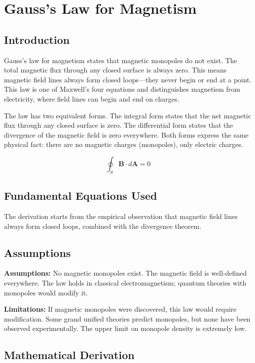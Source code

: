 \chapter{Gauss's Law for Magnetism}

\section*{Introduction}

Gauss's law for magnetism states that magnetic monopoles do not exist. The total magnetic flux through any closed surface is always zero. This means magnetic field lines always form closed loops---they never begin or end at a point. This law is one of Maxwell's four equations and distinguishes magnetism from electricity, where field lines can begin and end on charges.

The law has two equivalent forms. The integral form states that the net magnetic flux through any closed surface is zero. The differential form states that the divergence of the magnetic field is zero everywhere. Both forms express the same physical fact: there are no magnetic charges (monopoles), only electric charges.

\begin{equation}
\oint_S \mathbf{B} \cdot d\mathbf{A} = 0
\end{equation}

\section*{Fundamental Equations Used}

The derivation starts from the empirical observation that magnetic field lines always form closed loops, combined with the divergence theorem.

\section*{Assumptions}

\textbf{Assumptions:} No magnetic monopoles exist. The magnetic field is well-defined everywhere. The law holds in classical electromagnetism; quantum theories with monopoles would modify it.

\textbf{Limitations:} If magnetic monopoles were discovered, this law would require modification. Some grand unified theories predict monopoles, but none have been observed experimentally. The upper limit on monopole density is extremely low.

\section*{Mathematical Derivation}

